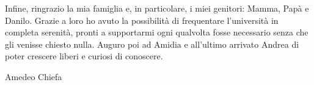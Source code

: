\noindent
Infine, ringrazio la mia famiglia e, in particolare, i miei genitori: Mamma, Papà e Danilo. Grazie a loro ho avuto la possibilità di frequentare l'università in completa serenità, pronti a supportarmi ogni qualvolta fosse necessario senza che gli venisse chiesto nulla. Auguro poi ad Amidia e all'ultimo arrivato Andrea di poter crescere liberi e curiosi di conoscere.

\begin{flushright}
  Amedeo Chiefa
\end{flushright}






